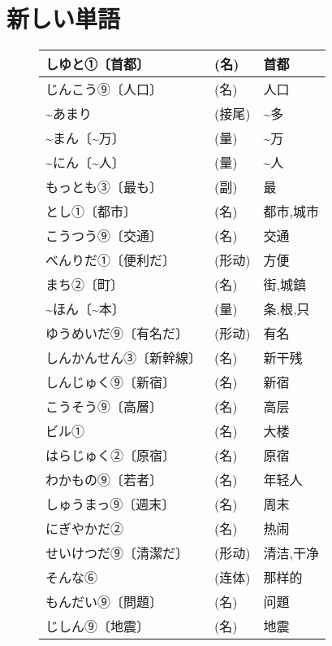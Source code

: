 
\usepackage{../../lectures_preamble}


    \section{新しい単語}
    \begin{figure}[htbp]
        \centering
        \begin{tabular}{l|l|l}
            しゆと①〔首都〕 & (名) & 首都\\\hline
            じんこう⑨〔人口〕 & (名) & 人口\\\hline
            \~{}あまり & (接尾) & \~{}多\\\hline
            \~{}まん〔\~{}万〕 & (量) & \~{}万\\\hline
            \~{}にん〔\~{}人〕 & (量) & \~{}人\\\hline
            もっとも③〔最も〕 & (副) & 最\\\hline
            とし①〔都市〕 & (名) & 都市,城市\\\hline
            こうつう⑨〔交通〕&(名)&交通\\\hline
            べんりだ①〔便利だ〕&(形动)&方便\\\hline
            まち②〔町〕&(名)&街,城鎮\\\hline
            \~{}ほん〔\~{}本〕&(量)&条,根,只\\\hline
            ゆうめいだ⑨〔有名だ〕&(形动)&有名\\\hline
            しんかんせん③〔新幹線〕&(名)&新干残\\\hline
            しんじゅく⑨〔新宿〕&(名)&新宿\\\hline
            こうそう⑨〔高層〕&(名)&高层\\\hline
            ビル①&(名)&大楼\\\hline
            はらじゅく②〔原宿〕&(名)&原宿\\\hline
            わかもの⑨〔若者〕&(名)&年轻人\\\hline
            しゅうまっ⑨〔週末〕&(名)&周末\\\hline
            にぎやかだ②&(名)&热闹\\\hline
            せいけつだ⑨〔清潔だ〕&(形动)&清洁,干净\\\hline
            そんな⑥&(连体)&那样的\\\hline
            もんだい⑨〔問題〕&(名)&问題\\\hline
            じしん⑨〔地震〕&(名)&地震\\\hline

\end{tabular}
\end{figure}
